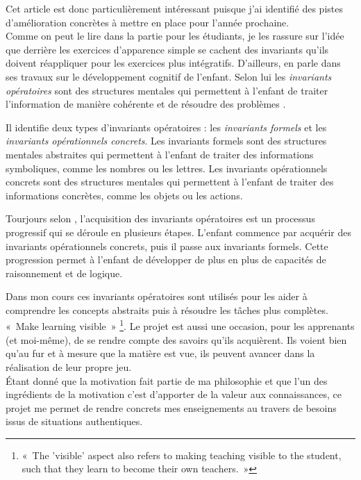 Cet article est donc particulièrement intéressant puisque j'ai identifié des pistes d’amélioration concrètes à mettre en place pour l'année prochaine.\\

Comme on peut le lire dans la partie pour les étudiants, je les rassure sur l'idée que derrière les exercices d'apparence simple se cachent des invariants qu'ils doivent réappliquer pour les exercices plus intégratifs. D'ailleurs, \citet{piaget1970structures} en parle dans ses travaux sur le développement cognitif de l'enfant. Selon lui les \emph{invariants opératoires} sont des structures mentales qui permettent à l'enfant de traiter l'information de manière cohérente et de résoudre des problèmes \cite{piaget1970structures}.

Il identifie deux types d'invariants opératoires : les \emph{invariants formels} et les \emph{invariants opérationnels concrets}. Les invariants formels sont des structures mentales abstraites qui permettent à l'enfant de traiter des informations symboliques, comme les nombres ou les lettres. Les invariants opérationnels concrets sont des structures mentales qui permettent à l'enfant de traiter des informations concrètes, comme les objets ou les actions.

Tourjours selon \citet{piaget1970structures}, l'acquisition des invariants opératoires est un processus progressif qui se déroule en plusieurs étapes. L'enfant commence par acquérir des invariants opérationnels concrets, puis il passe aux invariants formels. Cette progression permet à l'enfant de développer de plus en plus de capacités de raisonnement et de logique.

Dans mon cours ces invariants opératoires sont utilisés pour les  aider à comprendre les concepts abstraits puis à résoudre les tâches plus complètes.\\

«~Make learning visible~» \footnote{«~The 'visible' aspect also refers to making teaching visible to the student, such that they learn to become their own teachers.~»\cite{hattie2012visible}}\cite{hattie2012visible}. Le projet est aussi une occasion, pour les apprenants (et moi-même), de se rendre compte des savoirs qu'ils acquièrent. Ils voient bien qu'au fur et à mesure que la matière est vue, ils peuvent avancer dans la réalisation de leur propre jeu.\\
Étant donné que la motivation fait partie de ma philosophie et que l’un des ingrédients de la motivation c’est d’apporter de la valeur aux connaissances\cite{viau1994motivation}, ce projet me permet de rendre concrets mes enseignements au travers de besoins issus de situations authentiques.\\



